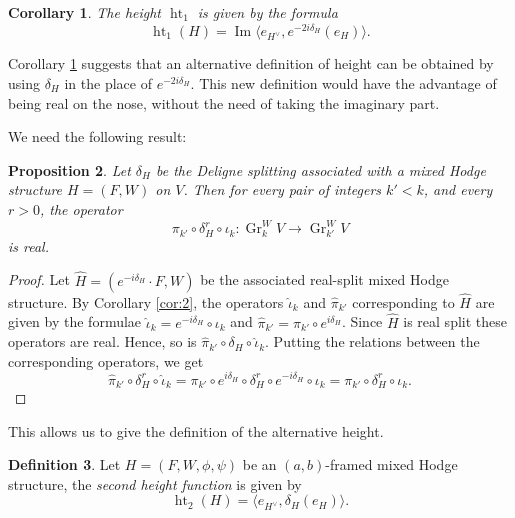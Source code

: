 \documentclass[11pt,a4paper]{amsart}
\DeclareMathOperator {\Gr} {Gr}
\DeclareMathOperator{\im}{Im}
\DeclareMathOperator{\Ht}{ht}
\numberwithin{equation}{section}
\theoremstyle{plain}
\newtheorem{prop}{Proposition}[section]
\newtheorem{cor}[prop]{Corollary}
\theoremstyle{definition}
\newtheorem{df}[prop]{Definition}
\begin{document}
\begin{cor}\label{cor:1}
  The height $\Ht_{1}$ is given by the formula
  \begin{displaymath}
  \Ht_{1}(H)=\im\langle e_{H^{\vee}},e^{-2i\delta_{H}} (e_{H})\rangle.
  \end{displaymath}
\end{cor}

Corollary \ref{cor:1} suggests that an alternative definition of height
can be obtained by using $\delta _{H}$ in the place of $e^{-2i\delta
  _{H}}$. This new definition would have the advantage of being real
on the nose, without the need of taking the imaginary part. 

 We need the following result:
\begin{prop}\label{prop-ht-2}
Let $\delta_{H}$ be the Deligne splitting associated with a mixed Hodge
structure $H=(F,W)$ on $V$. Then for every pair of integers $k' < k$,
and every $r>0$, the operator
\begin{displaymath}
  \pi_{k'}\circ \delta^{r}_{H} \circ \iota_{k}\colon
  \Gr_{k}^{W}V \longrightarrow \Gr_{k'}^{W}V 
\end{displaymath}
is real.
\end{prop}
\begin{proof}
Let $\hat{H}=(e^{-i\delta_{H}}\cdot F, W)$ be the associated
real-split mixed Hodge structure. By Corollary \ref{cor:2}, the
operators $\hat \iota_{k}$ and 
$\hat \pi _{k'}$ corresponding to $\hat H$ are given by the formulae 
$\hat{\iota}_{k}=e^{-i\delta_{H}}\circ \iota_{k}$ and
$\widehat{\pi}_{k'}= \pi_{k'}\circ
e^{i\delta_{H}}$. Since $\hat H$ is real split these operators are
real. Hence, so is $\hat{\pi}_{k'}\circ \delta_{H} \circ
\hat{\iota}_{k}$.
Putting the relations between the corresponding operators, we get
\begin{displaymath}
\hat{\pi}_{k'}\circ \delta^{r}_{H}\circ \hat{\iota}_{k}=\pi_{k'}\circ
e^{i\delta_{H}}\circ \delta^{r}_{H}\circ e^{-i\delta_{H}}\circ \iota_{k}
=\pi_{k'}\circ \delta^{r}_{H}\circ \iota_{k}.
\end{displaymath}
\end{proof}
This allows us to give the definition of the alternative height.
\begin{df}\label{def-ht-2} Let $H=(F,W, \phi,\psi)$ be 
an  $(a,b)$-framed mixed Hodge structure,
the \emph{second height function} is given by 
\begin{displaymath}
  \Ht_{2}(H)= \langle e_{H^{\vee}},\delta_{H} (e_{H})\rangle.
  \end{displaymath}
\end{df}
\end{document}
